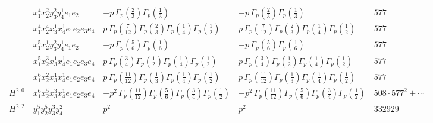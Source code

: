 \documentclass[11pt]{article}
\begin{document}
\begin{table}[ht]
{\begin{tabular}{@{}lllll@{}}
 & $x_{1}^{4} x_{2}^{2} y_{3}^{2} y_{4}^{1} e_{1} e_{2}$ & $- p \, \Gamma_p \left( \frac{2}{3} \right) \Gamma_p \left( \frac{1}{3} \right)$ & $- p \, \Gamma_p \left( \frac{2}{3} \right) \Gamma_p \left( \frac{1}{3} \right)$ & $577$ \\
 & $x_{1}^{4} x_{2}^{4} x_{3}^{1} x_{4}^{1}  e_{1} e_{2} e_{3} e_{4}$ & $p \, \Gamma_p \left( \frac{7}{12} \right) \Gamma_p \left( \frac{2}{3} \right) \Gamma_p \left( \frac{1}{4} \right) \Gamma_p \left( \frac{1}{2} \right)$ & $p \, \Gamma_p \left( \frac{7}{12} \right) \Gamma_p \left( \frac{2}{3} \right) \Gamma_p \left( \frac{1}{4} \right) \Gamma_p \left( \frac{1}{2} \right)$ & $577$ \\
 & $x_{1}^{5} x_{2}^{1} y_{3}^{2} y_{4}^{1} e_{1} e_{2}$ & $- p \, \Gamma_p \left( \frac{5}{6} \right) \Gamma_p \left( \frac{1}{6} \right)$ & $- p \, \Gamma_p \left( \frac{5}{6} \right) \Gamma_p \left( \frac{1}{6} \right)$ & $577$ \\
 & $x_{1}^{5} x_{2}^{3} x_{3}^{1} x_{4}^{1}  e_{1} e_{2} e_{3} e_{4}$ & $p \, \Gamma_p \left( \frac{3}{4} \right) \Gamma_p \left( \frac{1}{2} \right) \Gamma_p \left( \frac{1}{4} \right) \Gamma_p \left( \frac{1}{2} \right)$ & $p \, \Gamma_p \left( \frac{3}{4} \right) \Gamma_p \left( \frac{1}{2} \right) \Gamma_p \left( \frac{1}{4} \right) \Gamma_p \left( \frac{1}{2} \right)$ & $577$ \\
 & $x_{1}^{6} x_{2}^{2} x_{3}^{1} x_{4}^{1}  e_{1} e_{2} e_{3} e_{4}$ & $p \, \Gamma_p \left( \frac{11}{12} \right) \Gamma_p \left( \frac{1}{3} \right) \Gamma_p \left( \frac{1}{4} \right) \Gamma_p \left( \frac{1}{2} \right)$ & $p \, \Gamma_p \left( \frac{11}{12} \right) \Gamma_p \left( \frac{1}{3} \right) \Gamma_p \left( \frac{1}{4} \right) \Gamma_p \left( \frac{1}{2} \right)$ & $577$ \\
\midrule
$H^{2,0}$ & $x_{1}^{6} x_{2}^{5} x_{3}^{3} x_{4}^{1}  e_{1} e_{2} e_{3} e_{4}$ & $- p^{2} \, \Gamma_p \left( \frac{11}{12} \right) \Gamma_p \left( \frac{5}{6} \right) \Gamma_p \left( \frac{3}{4} \right) \Gamma_p \left( \frac{1}{2} \right)$ & $- p^{2} \, \Gamma_p \left( \frac{11}{12} \right) \Gamma_p \left( \frac{5}{6} \right) \Gamma_p \left( \frac{3}{4} \right) \Gamma_p \left( \frac{1}{2} \right)$ & $508{\cdot}577^{2}{+}\cdots$ \\
\midrule
$H^{2,2}$ & $y_{1}^{5} y_{2}^{5} y_{3}^{3} y_{4}^{2}$ & $p^{2} \,$ & $p^{2} \,$ & $332929$ \\
\bottomrule
\end{tabular}
}
\renewcommand{\arraystretch}{1.0}
\end{table}
\end{document}
